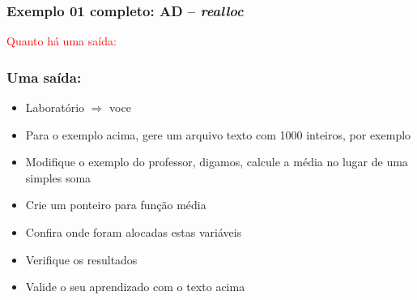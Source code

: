 \begin{frame}[allowframebreaks=0.9, c]

\frametitle{Exemplo 01 completo: AD -- \textit{realloc}}


\pause
\textcolor{red}{Quanto há uma saída:}
\end{frame}

\begin{frame}[fragile, c]

\frametitle{Uma saída:}
\begin{block}{}
\begin{itemize}
  \item Laboratório $\Rightarrow $ voce
  \item Para o exemplo acima, gere um arquivo texto com 1000 inteiros, por exemplo
  \item Modifique o exemplo do professor, digamos, calcule
  a média no lugar de uma simples soma
  \item Crie um ponteiro para  função média 
    \item Confira onde foram alocadas estas variáveis
  \item Verifique os resultados
  \item Valide o seu aprendizado com o texto acima 

\end{itemize}
\end{block}
\end{frame}
